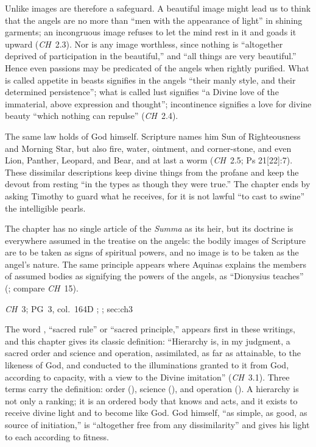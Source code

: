 Unlike images are therefore a safeguard. A beautiful image might lead us
to think that the angels are no more than ``men with the appearance of
light'' in shining garments; an incongruous image refuses to let the mind
rest in it and goads it upward (\emph{CH}~2.3). Nor is any image
worthless, since nothing is ``altogether deprived of participation in the
beautiful,'' and ``all things are very beautiful.'' Hence even passions
may be predicated of the angels when rightly purified. What is called
appetite in beasts signifies in the angels ``their manly style, and their
determined persistence''; what is called lust signifies ``a Divine love of
the immaterial, above expression and thought''; incontinence signifies a
love for divine beauty ``which nothing can repulse'' (\emph{CH}~2.4).

The same law holds of God himself. Scripture names him Sun of
Righteousness and Morning Star, but also fire, water, ointment, and
corner-stone, and even Lion, Panther, Leopard, and Bear, and at last a
worm (\emph{CH}~2.5; Ps 21[22]:7). These dissimilar descriptions keep divine
things from the profane and keep the devout from resting ``in the types
as though they were true.'' The chapter ends by asking Timothy to guard
what he receives, for it is not lawful ``to cast to swine'' the
intelligible pearls.

The chapter has no single article of the \emph{Summa} as its heir, but
its doctrine is everywhere assumed in the treatise on the angels: the
bodily images of Scripture are to be taken as signs of spiritual powers,
and no image is to be taken as the angel's nature. The same principle
appears where Aquinas explains the members of assumed bodies as
signifying the powers of the angels, as ``Dionysius teaches'' (; compare \emph{CH}~15).

{\emph{CH}~3; PG~3, col.~164D}
{; ;
}{sec:ch3}

The word , ``sacred rule'' or ``sacred principle,''
appears first in these writings, and this chapter gives its classic
definition: ``Hierarchy is, in my judgment, a sacred order and science
and operation, assimilated, as far as attainable, to the likeness of God,
and conducted to the illuminations granted to it from God, according to
capacity, with a view to the Divine imitation'' (\emph{CH}~3.1). Three
terms carry the definition: order (), science (),
and operation (). A hierarchy is not only a ranking; it is
an ordered body that knows and acts, and it exists to receive divine
light and to become like God. God himself, ``as simple, as good, as
source of initiation,'' is ``altogether free from any dissimilarity'' and
gives his light to each according to fitness.

